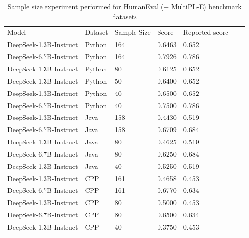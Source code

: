 \begin{table}[H]
\centering
\caption{Sample size experiment performed for HumanEval (+ MultiPL-E) benchmark datasets}
\begin{tabular}{|l|l|l|l|l|ll}
\cline{1-5}
Model & Dataset & Sample Size & Score & Reported score &  &  \\ \cline{1-5}
DeepSeek-1.3B-Instruct & Python  & 164         & 0.6463                             & 0.652          &  &  \\ \cline{1-5}
DeepSeek-6.7B-Instruct & Python  & 164         & 0.7926                             & 0.786          &  &  \\ \cline{1-5}
DeepSeek-1.3B-Instruct & Python  & 80          & 0.6125                             & 0.652          &  &  \\ \cline{1-5}
DeepSeek-1.3B-Instruct & Python  & 50          & 0.6400                             & 0.652          &  &  \\ \cline{1-5}
DeepSeek-1.3B-Instruct & Python  & 40          & 0.6500                             & 0.652          &  &  \\ \cline{1-5}
DeepSeek-6.7B-Instruct & Python  & 40          & 0.7500                             & 0.786          &  &  \\ \cline{1-5}
DeepSeek-1.3B-Instruct & Java    & 158         & 0.4430                             & 0.519          &  &  \\ \cline{1-5}
DeepSeek-6.7B-Instruct & Java    & 158         & 0.6709                             & 0.684          &  &  \\ \cline{1-5}
DeepSeek-1.3B-Instruct & Java    & 80          & 0.4625                             & 0.519          &  &  \\ \cline{1-5}
DeepSeek-6.7B-Instruct & Java    & 80          & 0.6250                             & 0.684          &  &  \\ \cline{1-5}
DeepSeek-1.3B-Instruct & Java    & 40          & 0.5250                             & 0.519          &  &  \\ \cline{1-5}
DeepSeek-1.3B-Instruct & CPP     & 161         & 0.4658                             & 0.453          &  &  \\ \cline{1-5}
DeepSeek-6.7B-Instruct & CPP     & 161         & 0.6770                             & 0.634          &  &  \\ \cline{1-5}
DeepSeek-1.3B-Instruct & CPP     & 80          & 0.5000                             & 0.453          &  &  \\ \cline{1-5}
DeepSeek-6.7B-Instruct & CPP     & 80          & 0.6500                             & 0.634          &  &  \\ \cline{1-5}
DeepSeek-1.3B-Instruct & CPP     & 40          & 0.3750                             & 0.453          &  &  \\ \cline{1-5}
\end{tabular}
\label{tab:DeepSeekSampleSize}
\end{table}


